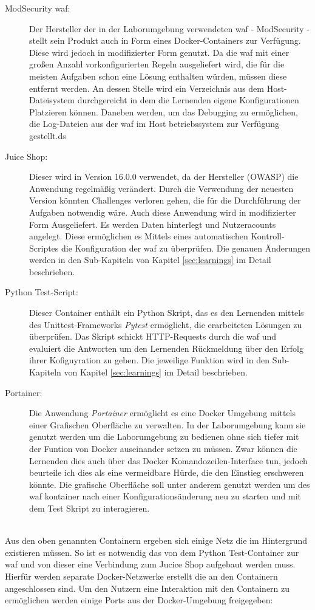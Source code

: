 \begin{description}
    \item[ModSecurity \ac{waf}:] Der Hersteller der in der Laborumgebung verwendeten \ac{waf} - ModSecurity - stellt sein Produkt auch in Form eines Docker-Containers zur Verfügung. 
    Diese wird jedoch in modifizierter Form genutzt.
    Da die \ac{waf} mit einer großen Anzahl vorkonfigurierten Regeln ausgeliefert wird, die für die meisten Aufgaben schon eine Lösung enthalten würden, müssen diese entfernt werden.
    An dessen Stelle wird ein Verzeichnis aus dem Host-Dateisystem durchgereicht in dem die Lernenden eigene Konfigurationen Platzieren können.
    Daneben werden, um das Debugging zu ermöglichen, die Log-Dateien aus der \ac{waf} im Host betriebssystem zur Verfügung gestellt.ds
    
    \item[Juice Shop:] Dieser wird in Version 16.0.0 verwendet, da der Hersteller (OWASP) die Anwendung regelmäßig verändert.
    Durch die Verwendung der neuesten Version könnten Challenges verloren gehen, die für die Durchführung der Aufgaben notwendig wäre.
    Auch diese Anwendung wird in modifizierter Form Ausgeliefert.
    Es werden Daten hinterlegt und Nutzeracounts angelegt.
    Diese ermöglichen es Mittels eines automatischen Kontroll-Scriptes die Konfiguration der \ac{waf} zu überprüfen.
    Die genauen Änderungen werden in den Sub-Kapiteln von Kapitel \ref{sec:learnings} im Detail beschrieben.

    \item[Python Test-Script:] Dieser Container enthält ein Python Skript, das es den Lernenden mittels des Unittest-Frameworks \textit{Pytest} ermöglicht, die erarbeiteten Lösungen zu überprüfen.
    Das Skript schickt HTTP-Requests durch die \ac{waf} und evaluiert die Antworten um den Lernenden Rückmeldung über den Erfolg ihrer Kofiguyration zu geben.
    Die jeweilige Funktion wird in den Sub-Kapiteln von Kapitel \ref{sec:learnings} im Detail beschrieben.

    \item[Portainer:] Die Anwendung \textit{Portainer} ermöglicht es eine Docker Umgebung mittels einer Grafischen Oberfläche zu verwalten.
    In der Laborumgebung kann sie genutzt werden um die Laborumgebung zu bedienen ohne sich tiefer mit der Funtion von Docker auseinander setzen zu müssen.
    Zwar können die Lernenden dies auch über das Docker Komandozeilen-Interface tun, jedoch beurteile ich dies als eine vermeidbare Hürde, die den Einstieg erschweren könnte.
    Die grafische Oberfläche soll unter anderem genutzt werden um des \ac{waf} kontainer nach einer Konfigurationsänderung neu zu starten und mit dem Test Skript zu interagieren. 
\end{description}
\ \\
Aus den oben genannten Containern ergeben sich einige Netz die im Hintergrund existieren müssen.
So ist es notwendig das von dem Python Test-Container zur \ac{waf} und von dieser eine Verbindung zum Jucice Shop aufgebaut werden muss.
Hierfür werden separate Docker-Netzwerke erstellt die an den Containern angeschlossen sind.
Um den Nutzern eine Interaktion mit den Containern zu ermöglichen werden einige Ports aus der Docker-Umgebung freigegeben:


